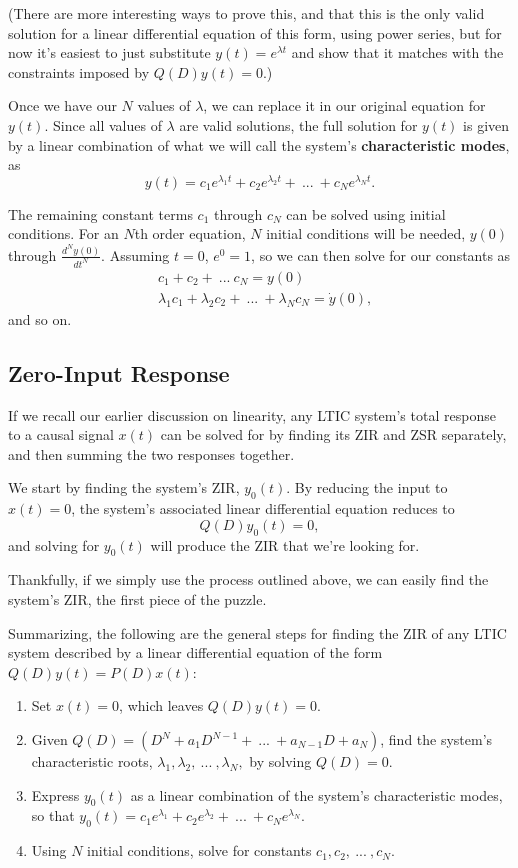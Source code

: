 \documentclass{article}
\begin{document}
	(There are more interesting ways to prove this, and that this is the only valid solution for a linear differential equation of this form, using power series, but for now it's easiest to just substitute \(y(t) = e^{\lambda t}\) and show that it matches with the constraints imposed by \(Q(D)y(t) = 0\).)

	Once we have our \(N\) values of \(\lambda\), we can replace it in our original equation for \(y(t)\). Since all values of \(\lambda\) are valid solutions, the full solution for \(y(t)\) is given by a linear combination of what we will call the system's \textbf{characteristic modes}, as 
	\[
		y(t) = c_1e^{\lambda_1 t} + c_2e^{\lambda_2 t} + \ ... \ + c_Ne^{\lambda_N t}.
	\] 

	The remaining constant terms \(c_1\) through \(c_N\) can be solved using initial conditions. For an \(N\)th order equation, \(N\) initial conditions will be needed, \(y(0)\) through \(\frac{d^Ny(0)}{dt^N}\). Assuming \(t=0\), \(e^0 = 1\), so we can then solve for our constants as 
	\begin{align*}
		& c_1 + c_2 + \ ... \ c_N = y(0) \\
		& \lambda_1c_1 + \lambda_2c_2 + \ ... \ + \lambda_Nc_N = \dot{y}(0),
	\end{align*}
	and so on.

\setcounter{subsection}{1}
\subsection{Zero-Input Response}

If we recall our earlier discussion on linearity, any LTIC system's total response to a causal signal \(x(t)\) can be solved for by finding its ZIR and ZSR separately, and then summing the two responses together. 

We start by finding the system's ZIR, \(y_0(t)\). By reducing the input to \(x(t) = 0\), the system's associated linear differential equation reduces to \[
  Q(D)y_0(t) = 0,
\] 
and solving for \(y_0(t)\) will produce the ZIR that we're looking for. 

Thankfully, if we simply use the process outlined above, we can easily find the system's ZIR, the first piece of the puzzle.

	Summarizing, the following are the general steps for finding the ZIR of any LTIC system described by a linear differential equation of the form \(Q(D)y(t) = P(D)x(t)\):

	\begin{enumerate}
		\item Set \(x(t) = 0\), which leaves \(Q(D)y(t) = 0\).
		\item Given \(Q(D) = (D^N + a_1D^{N-1} + \ ... \ + a_{N-1}D + a_N)\), find the system's characteristic roots, \(\lambda_1, \lambda_2, \ ... \ , \lambda_N,\) by solving \(Q(D) = 0\).
		\item Express \(y_0(t)\) as a linear combination of the system's characteristic modes, so that \(y_0(t) = c_1e^{\lambda_1} + c_2e^{\lambda_2} + \ ... \ + c_Ne^{\lambda_N}.\)
		\item Using \(N\) initial conditions, solve for constants \(c_1, c_2, \ ... \ , c_N\).
	\end{enumerate}
\end{document}
